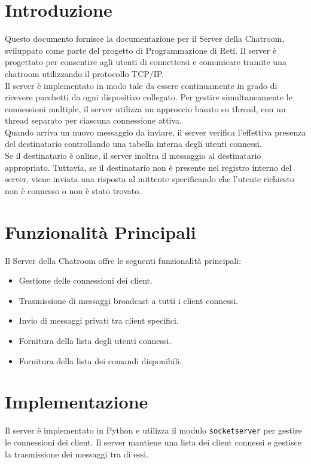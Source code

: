 \documentclass[a4paper,12pt]{report}
\begin{document}
\section{Introduzione}
Questo documento fornisce la documentazione per il Server della Chatroom, sviluppato come parte del progetto di Programmazione di Reti. Il server è progettato per consentire agli utenti di connettersi e comunicare tramite una chatroom utilizzando il protocollo TCP/IP.
\\
Il server è implementato in modo tale da essere continuamente in grado di ricevere pacchetti da ogni dispositivo collegato. Per gestire simultaneamente le connessioni multiple, il server utilizza un approccio basato su thread, con un thread separato per ciascuna connessione attiva.
\\
Quando arriva un nuovo messaggio da inviare, il server verifica l'effettiva presenza del destinatario controllando una tabella interna degli utenti connessi.
\\
Se il destinatario è online, il server inoltra il messaggio al destinatario appropriato. Tuttavia, se il destinatario non è presente nel registro interno del server, viene inviata una risposta al mittente specificando che l'utente richiesto non è connesso o non è stato trovato.
\section{Funzionalità Principali}
Il Server della Chatroom offre le seguenti funzionalità principali:
\begin{itemize}
	\item Gestione delle connessioni dei client.
	\item Trasmissione di messaggi broadcast a tutti i client connessi.
	\item Invio di messaggi privati tra client specifici.
	\item Fornitura della lista degli utenti connessi.
	\item Fornitura della lista dei comandi disponibili.
\end{itemize}
\section{Implementazione}
Il server è implementato in Python e utilizza il modulo \texttt{socketserver} per gestire le connessioni dei client. Il server mantiene una lista dei client connessi e gestisce la trasmissione dei messaggi tra di essi.
\end{document}
